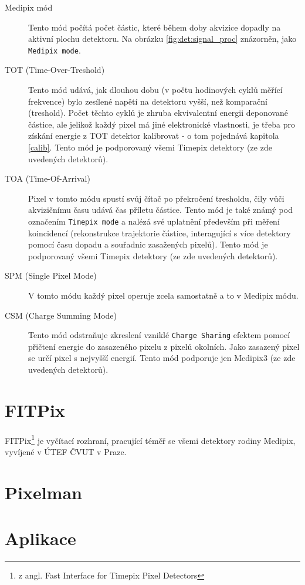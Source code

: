 \begin{description}
	\item[Medipix mód] Tento mód počítá počet částic, které během doby akvizice dopadly na aktivní plochu detektoru. Na obrázku \ref{fig:det:signal_proc} znázorněn, jako \texttt{Medipix mode}.
	\item[TOT (Time-Over-Treshold)] Tento mód udává, jak dlouhou dobu (v počtu hodinových cyklů měřící frekvence) bylo zesílené napětí na detektoru vyšší, než komparační (treshold). Počet těchto cyklů je zhruba ekvivalentní energii deponované částice, ale jelikož každý pixel má jiné elektronické vlastnosti, je třeba pro získání energie z TOT detektor kalibrovat - o tom pojednává kapitola \ref{calib}. Tento mód je podporovaný všemi Timepix detektory (ze zde uvedených detektorů).
	\item[TOA (Time-Of-Arrival)] Pixel v tomto módu spustí svůj čítač po překročení tresholdu, čily vůči akvizičnímu času udává čas příletu částice. Tento mód je také známý pod označením \texttt{Timepix mode} a nalézá své uplatnění především při měření koincidencí (rekonstrukce trajektorie částice, interagující s více detektory pomocí času dopadu a souřadnic zasažených pixelů). Tento mód je podporovaný všemi Timepix detektory (ze zde uvedených detektorů).
	\item[SPM (Single Pixel Mode)] V tomto módu každý pixel operuje zcela samostatně a to v Medipix módu.
	\item[CSM (Charge Summing Mode)] Tento mód odstraňuje zkreslení vzniklé \texttt{Charge Sharing} efektem pomocí přičtení energie do zasazeného pixelu z pixelů okolních. Jako zasazený pixel se určí pixel s nejvyšší energií. Tento mód podporuje jen Medipix3 (ze zde uvedených detektorů).

\end{description}

\section{FITPix}\label{det:fitpix}
FITPix\footnote{z angl. Fast Interface for Timepix Pixel Detectors} \cite{fitpix} je vyčítací rozhraní, pracující téměř se všemi detektory rodiny Medipix, vyvíjené v ÚTEF ČVUT v Praze.





\section{Pixelman}\label{det:pixelman}
\section{Aplikace}








